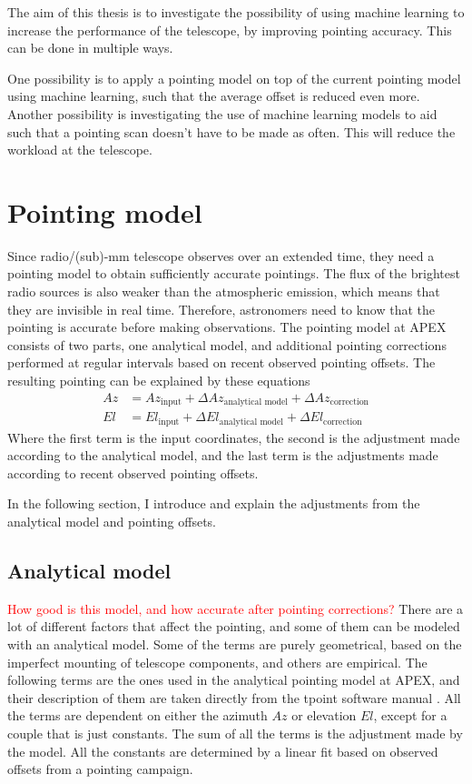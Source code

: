 The aim of this thesis is to investigate the possibility of using machine learning to increase the performance of the telescope, by improving pointing accuracy.
This can be done in multiple ways.

One possibility is to apply a pointing model on top of the current pointing model using machine learning, such that the average offset is reduced even more.
Another possibility is investigating the use of machine learning models to aid such that a pointing scan doesn't have to be made as often.
This will reduce the workload at the telescope. \\

\section{Pointing model}
Since radio/(sub)-mm telescope observes over an extended time, they need a pointing model to obtain sufficiently accurate pointings.
The flux of the brightest radio sources is also weaker than the atmospheric emission, which means that they are invisible in real time.
Therefore, astronomers need to know that the pointing is accurate before making observations.
The pointing model at APEX consists of two parts, one analytical model, and additional pointing corrections performed at regular intervals based on recent observed pointing offsets.
The resulting pointing can be explained by these equations
\begin{align}
    Az &= Az_\text{input} + \Delta Az_\text{analytical model} + \Delta Az_\text{correction} \\ 
    El &= El_\text{input} + \Delta El_\text{analytical model} + \Delta El_\text{correction}
\end{align}
Where the first term is the input coordinates, the second is the adjustment made according to the analytical model,
and the last term is the adjustments made according to recent observed pointing offsets.

In the following section, I introduce and explain the adjustments from the analytical model and pointing offsets. 


\subsection{Analytical model}
\textcolor{red}{How good is this model, and how accurate after pointing corrections?}
There are a lot of different factors that affect the pointing, 
and some of them can be modeled with an analytical model. Some of the terms are purely geometrical, based on the imperfect mounting of telescope components,
and others are empirical. The following terms are the ones used in the analytical pointing model at APEX,
and their description of them are taken directly from the tpoint software manual \cite{tpoint_manual}.
All the terms are dependent on either the azimuth $Az$ or elevation $El$, except for a couple that is just constants. 
The sum of all the terms is the adjustment made by the model.
All the constants are determined by a linear fit based on observed offsets from a pointing campaign.


